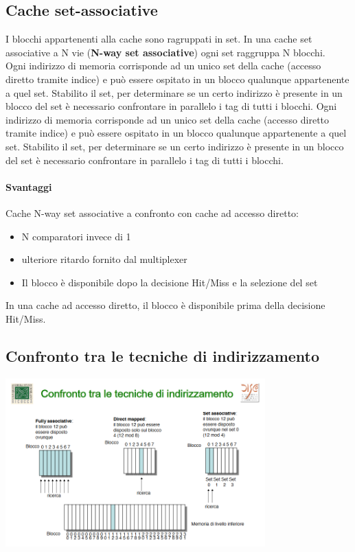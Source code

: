 \documentclass[12pt, a4paper, openany]{book}
\begin{document}
\subsection*{Cache set-associative}
I blocchi appartenenti alla cache sono ragruppati in set. In una cache set associative a N
vie (\textbf{N-way set associative}) ogni set raggruppa N blocchi.
\\ Ogni indirizzo di memoria corrisponde ad un unico set della cache (accesso diretto tramite indice)
e può essere ospitato in un blocco qualunque appartenente a quel set. 
Stabilito il set, per determinare se un certo indirizzo è presente in un blocco del set è necessario
confrontare in parallelo i tag di tutti i blocchi. Ogni indirizzo di memoria corrisponde
ad un unico set della cache (accesso diretto tramite indice) e può essere ospitato in
un blocco qualunque appartenente a quel set. Stabilito il set, per determinare se un certo
indirizzo è presente in un blocco del set è necessario confrontare in parallelo i tag di
tutti i blocchi.

\paragraph{Svantaggi} Cache N-way set associative a confronto con cache ad accesso diretto:
\begin{itemize}
    \item N comparatori invece di 1
    \item ulteriore ritardo fornito dal multiplexer
    \item Il blocco è disponibile dopo la decisione Hit/Miss e la selezione del set
\end{itemize}
In una cache ad accesso diretto, il blocco è disponibile prima della decisione Hit/Miss.

\subsection{Confronto tra le tecniche di indirizzamento}
\begin{center}
    \includegraphics[width=100mm, scale=0.5]{Cache - confronto tecniche di indirizzamento.png}
\end{center}
\end{document}
